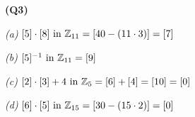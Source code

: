\documentclass[12pt, a4paper]{article}
\begin{document}
\textbf{(Q3)}

\vspace{5mm}
\textit{(a)} $[5] \cdot [8] \text{ in } \mathbb{Z}_{11} = [40 - (11 \cdot 3)] = [7]$

\vspace{5mm}
\textit{(b)} $[5]^{-1} \text{ in } \mathbb{Z}_{11} = [9]$

\vspace{5mm}
\textit{(c)} $[2] \cdot [3] + 4 \text{ in } \mathbb{Z}_{5} = [6] + [4] = [10] = [0]$

\vspace{5mm}
\textit{(d)} $[6] \cdot [5] \text{ in } \mathbb{Z}_{15} = [30 - (15 \cdot 2)] = [0]$
\end{document}

